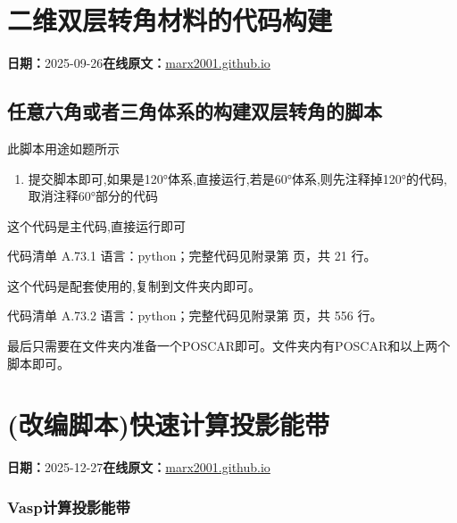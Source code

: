 \documentclass[lang=cn,scheme=chinese,color=blue,device=normal,toc=onecol,math=cm]{elegantbook}
\begin{document}
\section{二维双层转角材料的代码构建}
\begin{articlemeta}
\textbf{日期：}2025-09-26\hfill\textbf{在线原文：}\href{https://marx2001.github.io/sci-note\_posts/note11}{marx2001.github.io}
\end{articlemeta}

\subsection{任意六角或者三角体系的构建双层转角的脚本}


此脚本用途如题所示\par


\begin{enumerate}
\item 提交脚本即可,如果是120°体系,直接运行,若是60°体系,则先注释掉120°的代码,取消注释60°部分的代码
\end{enumerate}


这个代码是主代码,直接运行即可\par


\begin{codeindexbox}{代码清单 A.73.1}
语言：python；完整代码见附录第 \pageref{code:73:1} 页，共 21 行。
\end{codeindexbox}


这个代码是配套使用的,复制到文件夹内即可。\par


\begin{codeindexbox}{代码清单 A.73.2}
语言：python；完整代码见附录第 \pageref{code:73:2} 页，共 556 行。
\end{codeindexbox}


最后只需要在文件夹内准备一个POSCAR即可。文件夹内有POSCAR和以上两个脚本即可。\par



\section{(改编脚本)快速计算投影能带}
\begin{articlemeta}
\textbf{日期：}2025-12-27\hfill\textbf{在线原文：}\href{https://marx2001.github.io/sci-note\_posts/20251227-band}{marx2001.github.io}
\end{articlemeta}

\subsubsection{Vasp计算投影能带}
\end{document}
